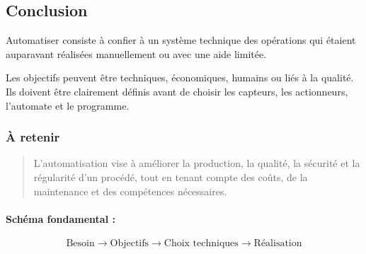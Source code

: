 \subsection{Conclusion}

Automatiser consiste à confier à un système technique des opérations qui étaient auparavant réalisées manuellement ou avec une aide limitée.

Les objectifs peuvent être techniques, économiques, humains ou liés à la qualité. Ils doivent être clairement définis avant de choisir les capteurs, les actionneurs, l'automate et le programme.

\subsubsection*{À retenir}

\begin{quote}
L'automatisation vise à améliorer la production, la qualité, la sécurité et la régularité d'un procédé, tout en tenant compte des coûts, de la maintenance et des compétences nécessaires.
\end{quote}

\paragraph{Schéma fondamental :}

\[
\text{Besoin} \rightarrow \text{Objectifs} \rightarrow \text{Choix techniques} \rightarrow \text{Réalisation}
\]